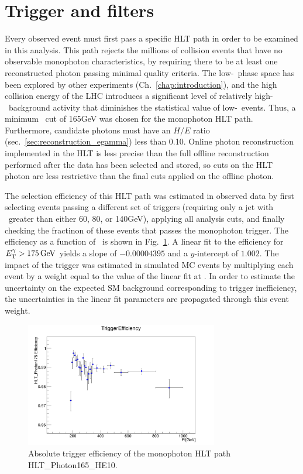 \section{Trigger and \texorpdfstring{\MET}{pTmiss} filters} \label{sec:event_selection_trigger_METfilters}
Every observed event must first pass a specific HLT path in order to be examined in this analysis. This path rejects the millions of collision events that have no observable
monophoton characteristics, by requiring there to be at least one reconstructed photon passing minimal quality criteria.
The low-\pTgamma\ phase space has been explored by other experiments (Ch.~\ref{chap:introduction}), and the high collision energy of the LHC introduces a significant
level of relatively high-\pT\ background activity that diminishes the statistical value of low-\pTgamma\ events.
Thus, a minimum \ETgamma\ cut of 165\unit{GeV} was chosen for the monophoton HLT path.
Furthermore, candidate photons must have an $H/E$ ratio (sec.~\ref{sec:reconstruction_egamma}) less than 0.10.
Online photon reconstruction implemented in the HLT is less precise than the full offline reconstruction performed after the data has been selected and stored,
so cuts on the HLT photon are less restrictive than the final cuts applied on the offline photon.

The selection efficiency of this HLT path was estimated in observed data by first selecting events passing a different set of triggers (requiring only a jet with \pT\ greater than
either 60, 80, or 140\unit{GeV}), applying all analysis cuts, and finally checking the fractinon of these events that passes the monophoton trigger.
The efficiency as a function of \ETgamma\ is shown in Fig.~\ref{fig:trigger_efficiency}.
A linear fit to the efficiency for $\ETgamma > 175\unit{GeV}$ yields a slope of $-0.00004395$ and a  $y$-intercept of $1.002$. The impact of the trigger was estimated
in simulated MC events by multiplying each event by a weight equal to the value of the linear fit at \ETgamma. In order to estimate the uncertainty on the expected
SM background corresponding to trigger inefficiency, the uncertainties in the linear fit parameters are propagated through this event weight.

\begin{figure}[hbtp]
  \begin{center}
    \includegraphics[width=0.75\textwidth]{Figures/triggereff_zoom.png}
    \caption{
    Absolute trigger efficiency of the monophoton HLT path HLT\_Photon165\_HE10.
    }
    \label{fig:trigger_efficiency}
  \end{center}
\end{figure}

